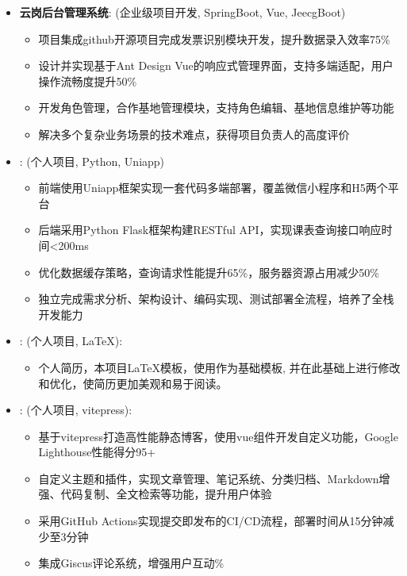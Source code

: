 \documentclass[zh]{resume}
\begin{document}
\begin{itemize}
  \item \textbf{云岗后台管理系统}:
    (企业级项目开发, SpringBoot, Vue, JeecgBoot)
    \begin{itemize}
      \item 项目集成github开源项目完成发票识别模块开发，提升数据录入效率75\%
      \item 设计并实现基于Ant Design Vue的响应式管理界面，支持多端适配，用户操作流畅度提升50\%
      \item 开发角色管理，合作基地管理模块，支持角色编辑、基地信息维护等功能
      \item 解决多个复杂业务场景的技术难点，获得项目负责人的高度评价
    \end{itemize}

  \item {}:
    (个人项目, Python, Uniapp)
    \begin{itemize}
      \item 前端使用Uniapp框架实现一套代码多端部署，覆盖微信小程序和H5两个平台
      \item 后端采用Python Flask框架构建RESTful API，实现课表查询接口响应时间<200ms
      \item 优化数据缓存策略，查询请求性能提升65\%，服务器资源占用减少50\%
      \item 独立完成需求分析、架构设计、编码实现、测试部署全流程，培养了全栈开发能力
    \end{itemize}
    
    \item {}:
    (个人项目, LaTeX):
    \begin{itemize}
      \item 个人简历，本项目LaTeX模板，使用作为基础模板, 并在此基础上进行修改和优化，使简历更加美观和易于阅读。
    \end{itemize}
  
  \item {}:
    (个人项目, vitepress):
    \begin{itemize}
      \item 基于vitepress打造高性能静态博客，使用vue组件开发自定义功能，Google Lighthouse性能得分95+
      \item 自定义主题和插件，实现文章管理、笔记系统、分类归档、Markdown增强、代码复制、全文检索等功能，提升用户体验
      \item 采用GitHub Actions实现提交即发布的CI/CD流程，部署时间从15分钟减少至3分钟
      \item 集成Giscus评论系统，增强用户互动\%
    \end{itemize}
  

\end{itemize}
\end{document}

